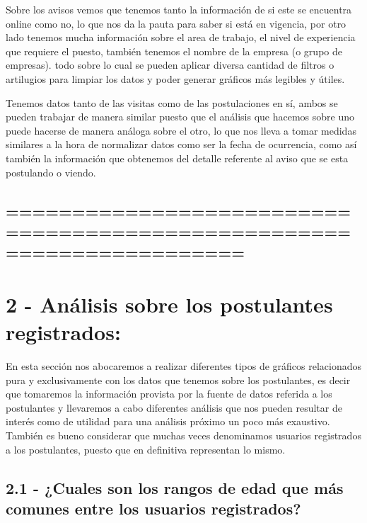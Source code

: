 \documentclass[11pt]{article}
\begin{document}
Sobre los avisos vemos que tenemos tanto la información de si este se
encuentra online como no, lo que nos da la pauta para saber si está en
vigencia, por otro lado tenemos mucha información sobre el area de
trabajo, el nivel de experiencia que requiere el puesto, también tenemos
el nombre de la empresa (o grupo de empresas). todo sobre lo cual se
pueden aplicar diversa cantidad de filtros o artilugios para limpiar los
datos y poder generar gráficos más legibles y útiles.

Tenemos datos tanto de las visitas como de las postulaciones en sí,
ambos se pueden trabajar de manera similar puesto que el análisis que
hacemos sobre uno puede hacerse de manera análoga sobre el otro, lo que
nos lleva a tomar medidas similares a la hora de normalizar datos como
ser la fecha de ocurrencia, como así también la información que
obtenemos del detalle referente al aviso que se esta postulando o
viendo.

\hypertarget{section-1}{%
\subsection{======================================================================}\label{section-1}}

    \hypertarget{anuxe1lisis-sobre-los-postulantes-registrados}{%
\section{2 - Análisis sobre los postulantes
registrados:}\label{anuxe1lisis-sobre-los-postulantes-registrados}}

En esta sección nos abocaremos a realizar diferentes tipos de gráficos
relacionados pura y exclusivamente con los datos que tenemos sobre los
postulantes, es decir que tomaremos la información provista por la
fuente de datos referida a los postulantes y llevaremos a cabo
diferentes análisis que nos pueden resultar de interés como de utilidad
para una análisis próximo un poco más exaustivo. También es bueno
considerar que muchas veces denominamos usuarios registrados a los
postulantes, puesto que en definitiva representan lo mismo.

\hypertarget{cuales-son-los-rangos-de-edad-que-muxe1s-comunes-entre-los-usuarios-registrados}{%
\subsection{2.1 - ¿Cuales son los rangos de edad que más comunes entre
los usuarios
registrados?}\label{cuales-son-los-rangos-de-edad-que-muxe1s-comunes-entre-los-usuarios-registrados}}
\end{document}
